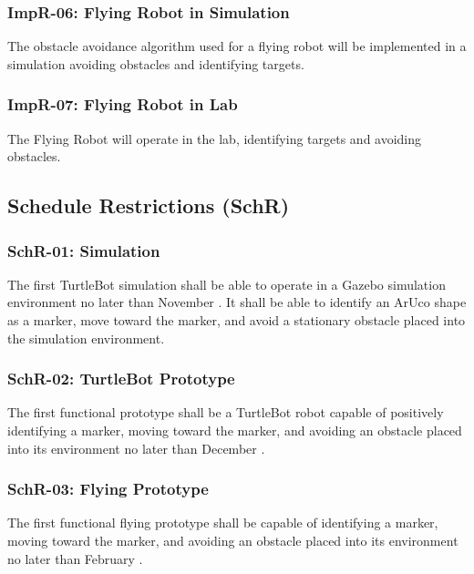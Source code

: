 \documentclass{article}
\begin{document}
		\subsubsection{ImpR-06: Flying Robot in Simulation}
		
		The obstacle avoidance algorithm used for a flying robot will be implemented in a simulation avoiding obstacles and identifying targets.
		
		\subsubsection{ImpR-07: Flying Robot in Lab}
		
		The Flying Robot will operate in the lab, identifying targets and avoiding obstacles.
		
	\subsection{Schedule Restrictions (SchR)}
	
		\subsubsection{SchR-01: Simulation}
		
		The first TurtleBot simulation shall be able to operate in a Gazebo simulation environment no later than November . It shall be able to identify an ArUco shape as a marker, move toward the marker, and avoid a stationary obstacle placed into the simulation environment.
		
		\subsubsection{SchR-02: TurtleBot Prototype}
		
		The first functional prototype shall be a TurtleBot robot capable of positively identifying a marker, moving toward the marker, and avoiding an obstacle placed into its environment no later than December .
		
		\subsubsection{SchR-03: Flying Prototype}
		
		The first functional flying prototype shall be capable of identifying a marker, moving toward the marker, and avoiding an obstacle placed into its environment no later than February  .
\end{document}
